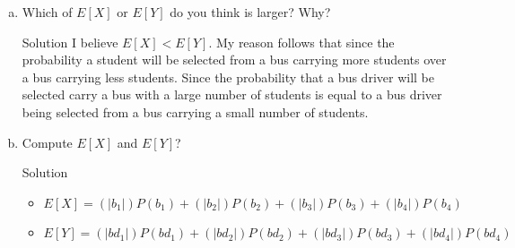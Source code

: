 \documentclass{article}
\begin{document}
\begin{spacing}{1.1}
\begin{homeworkProblem}
\begin{enumerate}[(a)]
    \item Which of $E[ X]$ or $E[ Y]$ do you think is larger? Why?
      \begin{homeworkSection}{Solution}
        I believe $E[ X] < E[ Y]$.  My reason follows that since the 
        probability a student will be selected from a bus carrying more students 
        over a bus carrying less students.  
        Since the probability that a bus driver will be selected carry a bus with a large
        number of students is equal to a bus driver being selected from a bus carrying
        a small number of students.
      \end{homeworkSection}
    \item Compute $E[ X]$ and $E[ Y]$?
      \begin{homeworkSection}{Solution}
        \begin{itemize}
          \item $E[ X] = (|b_1|) P( b_1) + (|b_2|) P( b_2) + (|b_3|) P( b_3) + (|b_4|) P( b_4)$
          \item $E[ Y] = (|bd_1|) P( bd_1) + (|bd_2|) P( bd_2) + (|bd_3|) P( bd_3) + (|bd_4|) P( bd_4)$
        \end{itemize}
      \end{homeworkSection}
  \end{enumerate}
\end{homeworkProblem}


\end{spacing}
\end{document}
